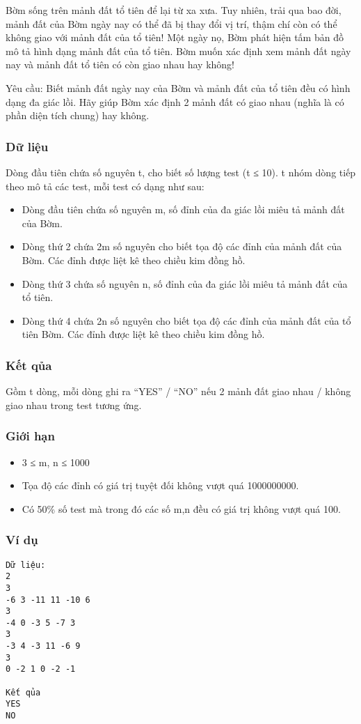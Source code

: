 



   Bờm sống trên mảnh đất tổ tiên để lại từ xa xưa. Tuy nhiên, trải qua bao đời, mảnh đất của Bờm ngày nay có thể đã bị thay đổi vị trí, thậm chí còn có thể không giao với mảnh đất của tổ tiên! Một ngày nọ,   Bờm phát hiện tấm bản đồ mô tả hình dạng mảnh đất của tổ tiên. Bờm muốn xác định xem mảnh đất ngày nay và mảnh đất tổ tiên có còn giao nhau hay không!  

   Yêu cầu: Biết mảnh đất ngày nay của Bờm và mảnh đất của tổ tiên đều có hình dạng đa giác lồi. Hãy giúp Bờm xác định 2 mảnh đất có giao nhau (nghĩa là có phần diện tích chung) hay không.  

\subsubsection{   Dữ liệu  }

   Dòng đầu tiên chứa số nguyên t, cho biết số lượng test (t ≤ 10). t nhóm dòng tiếp theo mô tả các test, mỗi test có dạng như sau:  
\begin{itemize}
	\item     Dòng đầu tiên chứa số nguyên m, số đỉnh của đa giác lồi miêu tả mảnh đất của Bờm.   
	\item     Dòng thứ 2 chứa 2m số nguyên cho biết tọa độ các đỉnh của mảnh đất của Bờm. Các đỉnh được liệt kê theo chiều kim đồng hồ.   
	\item     Dòng thứ 3 chứa số nguyên n, số đỉnh của đa giác lồi miêu tả mảnh đất của tổ tiên.   
	\item     Dòng thứ 4 chứa 2n số nguyên cho biết tọa độ các đỉnh của mảnh đất của tổ tiên Bờm. Các đỉnh được liệt kê theo chiều kim đồng hồ.   
\end{itemize}

\subsubsection{   Kết qủa  }

   Gồm t dòng, mỗi dòng ghi ra “YES” / “NO” nếu 2 mảnh đất giao nhau / không giao nhau trong test tương ứng.  

\subsubsection{   Giới hạn  }
\begin{itemize}
	\item     3 ≤ m, n ≤ 1000   
	\item     Tọa độ các đỉnh có giá trị tuyệt đối không vượt quá 1000000000.   
	\item     Có 50\% số test mà trong đó các số m,n đều có giá trị không vượt quá 100.   
\end{itemize}

\subsubsection{   Ví dụ  }
\begin{verbatim}
Dữ liệu:
2
3
-6 3 -11 11 -10 6 
3
-4 0 -3 5 -7 3 
3
-3 4 -3 11 -6 9 
3
0 -2 1 0 -2 -1 

Kết qủa
YES
NO
\end{verbatim}